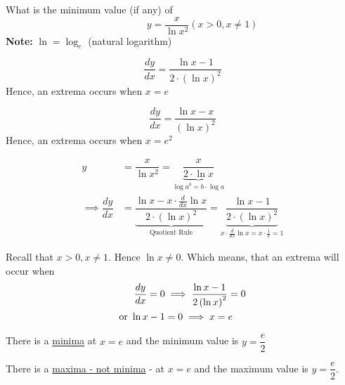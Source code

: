 \documentclass[14pt,fleqn]{extarticle}
\begin{document}
\begin{problem}
\statement
	
What is the minimum value (if any) of
\[ \qquad \qquad y = \dfrac{x}{\ln x^2} \left( x > 0, x\neq 1\right)  \] 
\textbf{Note: }$\ln = \log_e$ (natural logarithm)
%
\begin{step}
	\begin{options}
		\correct

		\[\dfrac{dy}{dx} = \dfrac{\ln x - 1}{2\cdot \left(\ln x\right)^2}\]
		Hence, an extrema occurs when $x = e$ 

		\incorrect

		\[\dfrac{dy}{dx} = \dfrac{\ln x - x}{\left(\ln x\right)^2}\]
		Hence, an extrema occurs when $x = e^2$ 
	\end{options}
	\reason

	\begin{align}
y &= \dfrac{x}{\ln x^2} = \underbrace{\dfrac{x}{2\cdot\ln x}}_{\log a^b = b\cdot\log a}\\ 
\implies\dfrac{dy}{dx} &= \underbrace{\dfrac{\ln x - x\cdot\frac{d}{dx}\ln x}
{2\cdot\left(\ln x\right)^2}}_{\text{Quotient Rule}} = 
\underbrace{\dfrac{\ln x - 1}{2\cdot \left(\ln x\right)^2}}_{x\cdot\frac{d}{dx}\ln x = x\cdot\frac{1}{x} = 1}
\end{align}

Recall that $x > 0, x\neq 1$. Hence $\ln x\neq 0$. Which means, that an extrema 
will occur when 
\begin{align}
	\frac{dy}{dx} = 0 &\implies \dfrac{\ln x - 1}{2 \left(\ln x \right)^2} = 0 \\
	\text{or } \ln x -1 &= 0 \implies x = e
\end{align}


\end{step}

\begin{step}
	\begin{options}
		\correct

		There is a \underline{minima} at $x = e$ and the minimum value is 
		$y = \dfrac{e}{2}$ 
%

		\incorrect

There is a \underline{maxima - not minima} - at $x = e$ 
and the maximum value is $y = \dfrac{e}{2}$.

	\end{options}
	\reason


\end{step}
\end{problem}
\end{document}
